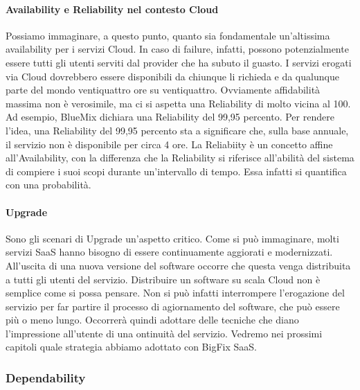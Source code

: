 \paragraph{Availability e Reliability nel contesto Cloud}
Possiamo immaginare, a questo punto, quanto sia fondamentale un'altissima availability per i servizi Cloud. In caso di failure, infatti, possono potenzialmente essere tutti gli utenti serviti dal provider che ha subuto il guasto. I servizi erogati via Cloud dovrebbero essere disponibili da chiunque li richieda e da qualunque parte del mondo ventiquattro ore su ventiquattro. Ovviamente affidabilità massima non è verosimile, ma ci si aspetta una Reliability di molto vicina al 100. Ad esempio, BlueMix dichiara una Reliability del 99,95 percento. Per rendere l'idea, una Reliability del 99,95 percento sta a significare che, sulla base annuale, il servizio non è disponibile per circa 4 ore. La Reliabiity è un concetto affine all'Availability, con la differenza che la Reliability si riferisce all'abilità del sistema di compiere i suoi scopi durante un'intervallo di tempo. Essa infatti si quantifica con una probabilità.

\paragraph{Upgrade}
Sono gli scenari di Upgrade un'aspetto critico. Come si può immaginare, molti servizi SaaS hanno bisogno di essere continuamente aggiorati e modernizzati. All'uscita di una nuova versione del software occorre che questa venga distribuita a tutti gli utenti del servizio. Distribuire un software su scala Cloud non è semplice come si possa pensare. Non si può infatti interrompere l'erogazione del servizio per far partire il processo di agiornamento del software, che può essere più o meno lungo. Occorrerà quindi adottare delle tecniche che diano l'impressione all'utente di una ontinuità del servizio. Vedremo nei prossimi capitoli quale strategia abbiamo adottato con BigFix SaaS. 

\subsubsection{Dependability}

